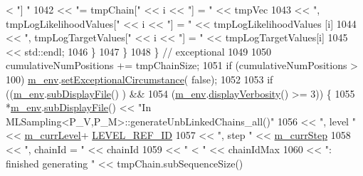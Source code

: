 \begin{DoxyCode}
      < \textcolor{stringliteral}{"] "}
1042                                     << \textcolor{stringliteral}{"= tmpChain["}               << i << \textcolor{stringliteral}{"] = "} << tmpVec
1043                                     << \textcolor{stringliteral}{", tmpLogLikelihoodValues["} << i << \textcolor{stringliteral}{"] = "} << tmpLogLikelihoodValues
      [i]
1044                                     << \textcolor{stringliteral}{", tmpLogTargetValues["}     << i << \textcolor{stringliteral}{"] = "} << tmpLogTargetValues[i]
1045                                     << std::endl;
1046           \}
1047         \}
1048       \} \textcolor{comment}{// exceptional}
1049 
1050       cumulativeNumPositions += tmpChainSize;
1051       \textcolor{keywordflow}{if} (cumulativeNumPositions > 100) \hyperlink{class_q_u_e_s_o_1_1_m_l_sampling_a13f1ca4fe9f94822fe572a743eaced1d}{m\_env}.\hyperlink{class_q_u_e_s_o_1_1_base_environment_abb2a6a8de19058957f856341fce2440e}{setExceptionalCircumstance}(\textcolor{keyword}{
      false});
1052 
1053       \textcolor{keywordflow}{if} ((\hyperlink{class_q_u_e_s_o_1_1_m_l_sampling_a13f1ca4fe9f94822fe572a743eaced1d}{m\_env}.\hyperlink{class_q_u_e_s_o_1_1_base_environment_a8a0064746ae8dddfece4229b9ad374d6}{subDisplayFile}()       ) &&
1054           (\hyperlink{class_q_u_e_s_o_1_1_m_l_sampling_a13f1ca4fe9f94822fe572a743eaced1d}{m\_env}.\hyperlink{class_q_u_e_s_o_1_1_base_environment_a1fe5f244fc0316a0ab3e37463f108b96}{displayVerbosity}() >= 3)) \{
1055         *\hyperlink{class_q_u_e_s_o_1_1_m_l_sampling_a13f1ca4fe9f94822fe572a743eaced1d}{m\_env}.\hyperlink{class_q_u_e_s_o_1_1_base_environment_a8a0064746ae8dddfece4229b9ad374d6}{subDisplayFile}() << \textcolor{stringliteral}{"In
       MLSampling<P\_V,P\_M>::generateUnbLinkedChains\_all()"}
1056                                 << \textcolor{stringliteral}{", level "}               << \hyperlink{class_q_u_e_s_o_1_1_m_l_sampling_af9416874c856e50f3b35270e801f17e4}{m\_currLevel}+
      \hyperlink{_m_l_sampling_level_options_8h_a68d15eaf394d210effcf584b938206d3}{LEVEL\_REF\_ID}
1057                                 << \textcolor{stringliteral}{", step "}                << \hyperlink{class_q_u_e_s_o_1_1_m_l_sampling_a1b1f8ccb4823bdfa26ec652f0807c63e}{m\_currStep}
1058                                 << \textcolor{stringliteral}{", chainId = "}           << chainId
1059                                 << \textcolor{stringliteral}{" < "}                    << chainIdMax
1060                                 << \textcolor{stringliteral}{": finished generating "} << tmpChain.subSequenceSize()

\end{DoxyCode}
